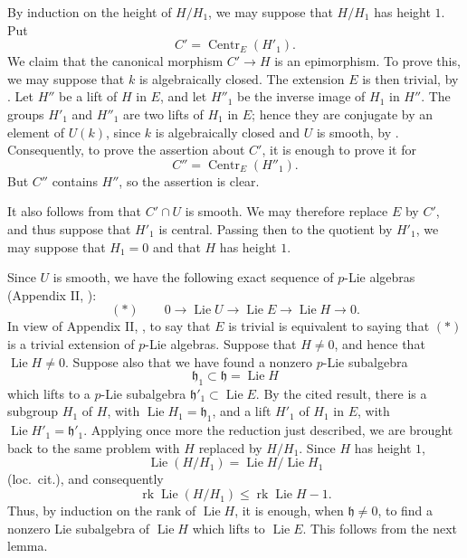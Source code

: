 
By induction on the height of \(H/H_1\), we may suppose that
\(H/H_1\) has height \(1\).  Put
\[
  C'=\operatorname{Centr}_E(H'_1).
\]
We claim that the canonical morphism \(C'\longrightarrow H\) is an
epimorphism.  To prove this, we may suppose that \(k\) is
algebraically closed.  The extension \(E\) is then trivial, by
.  Let \(H''\) be a lift of \(H\) in \(E\), and let
\(H''_1\) be the inverse image of \(H_1\) in \(H''\).  The groups
\(H'_1\) and \(H''_1\) are two lifts of \(H_1\) in \(E\); hence they
are conjugate by an element of \(U(k)\), since \(k\) is
algebraically closed and \(U\) is smooth, by .
Consequently, to prove the assertion about \(C'\), it is enough to
prove it for
\[
  C''=\operatorname{Centr}_E(H''_1).
\]
But \(C''\) contains \(H''\), so the assertion is clear.

It also follows from  that \(C'\cap U\) is smooth.  We may
therefore replace \(E\) by \(C'\), and thus suppose that \(H'_1\) is
central.  Passing then to the quotient by \(H'_1\), we may suppose
that \(H_1=0\) and that \(H\) has height \(1\).

Since \(U\) is smooth, we have the following exact sequence of
\(p\)-Lie algebras (Appendix II, ):
\[
  (*)\qquad
  0\longrightarrow\operatorname{Lie}U
   \longrightarrow\operatorname{Lie}E
   \longrightarrow\operatorname{Lie}H
   \longrightarrow0.
\]
In view of Appendix II, , to say that \(E\) is trivial is
equivalent to saying that \((*)\) is a trivial extension of
\(p\)-Lie algebras.  Suppose that \(H\ne0\), and hence that
\(\operatorname{Lie}H\ne0\).  Suppose also that we have found a
nonzero \(p\)-Lie subalgebra
\[
  \mathfrak h_1\subset\mathfrak h=\operatorname{Lie}H
\]
which lifts to a \(p\)-Lie subalgebra
\(\mathfrak h'_1\subset\operatorname{Lie}E\).  By the cited result,
there is a subgroup \(H_1\) of \(H\), with
\(\operatorname{Lie}H_1=\mathfrak h_1\), and a lift \(H'_1\) of
\(H_1\) in \(E\), with
\(\operatorname{Lie}H'_1=\mathfrak h'_1\).  Applying once more the
reduction just described, we are brought back to the same problem
with \(H\) replaced by \(H/H_1\).  Since \(H\) has height \(1\),
\[
  \operatorname{Lie}(H/H_1)
   =\operatorname{Lie}H/\operatorname{Lie}H_1
\]
(loc.\ cit.), and consequently
\[
  \operatorname{rk}\operatorname{Lie}(H/H_1)
  \leq \operatorname{rk}\operatorname{Lie}H-1.
\]
Thus, by induction on the rank of \(\operatorname{Lie}H\), it is
enough, when \(\mathfrak h\ne0\), to find a nonzero Lie subalgebra
of \(\operatorname{Lie}H\) which lifts to \(\operatorname{Lie}E\).
This follows from the next lemma.

